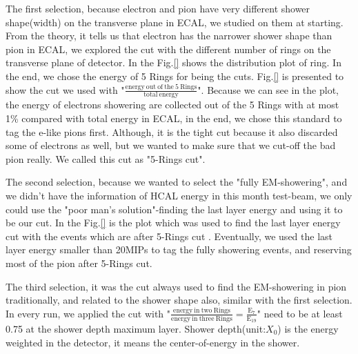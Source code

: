 The first selection, because electron and pion have very different shower shape(width) on the transverse plane in ECAL, we studied on them at starting. From the theory, it tells us that electron has the narrower shower shape than pion in ECAL, we explored the cut with the different number of rings on the transverse plane of detector. In the Fig.\ref{} shows the distribution plot of ring. In the end, we chose the energy of 5 Rings for being the cuts. Fig.\ref{} is presented to show the cut we used with "$\frac{\mathrm{energy \ out \ of \ the \ 5 \ Rings}}{\mathrm{total \ energy}}$". Because we can see in the plot, the energy of electrons showering are collected out of the 5 Rings with at most 1\% compared with total energy in ECAL, in the end, we chose this standard to tag the e-like pions first. Although, it is the tight cut because it also discarded some of electrons as well, but we wanted to make sure that we cut-off the bad pion really. We called this cut as "5-Rings cut".

The second selection, because we wanted to select the "fully EM-showering", and we didn't have the information of HCAL energy in this month test-beam, we only could use the "poor man's solution"-finding the last layer energy and using it to be our cut. In the Fig.\ref{} is the plot which was used to find the last layer energy cut with the events which are after 5-Rings cut . Eventually, we used the last layer energy smaller than 20MIPs to tag the fully showering events, and reserving most of the pion after 5-Rings cut.

The third selection, it was the cut always used to find the EM-showering in pion traditionally, and related to the shower shape also, similar with the first selection. In every run, we applied the cut with "$\frac{\mathrm{energy \ in \ two \ Rings}}{\mathrm{energy \ in \ three \ Rings}} = \frac{\mathrm{E_{7}}}{\mathrm{E_{19}}}$" need to be at least 0.75 at the shower depth maximum layer. Shower depth(unit:$X_{0}$) is the energy weighted in the detector, it means the center-of-energy in the shower.   

